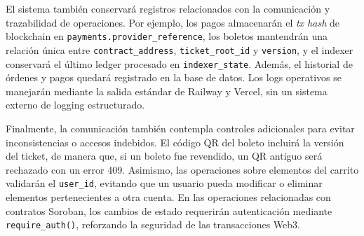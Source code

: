 \documentclass[12pt,letterpaper]{article}
\begin{document}
El sistema también conservará registros relacionados con la comunicación y
trazabilidad de operaciones. Por ejemplo, los pagos almacenarán el
\textit{tx hash} de blockchain en \texttt{payments.provider\_reference}, los
boletos mantendrán una relación única entre \texttt{contract\_address},
\texttt{ticket\_root\_id} y \texttt{version}, y el indexer conservará el
último ledger procesado en \texttt{indexer\_state}. Además, el historial de
órdenes y pagos quedará registrado en la base de datos. Los logs operativos se
manejarán mediante la salida estándar de Railway y Vercel, sin un sistema
externo de logging estructurado.

Finalmente, la comunicación también contempla controles adicionales para evitar
inconsistencias o accesos indebidos. El código QR del boleto incluirá la versión
del ticket, de manera que, si un boleto fue revendido, un QR antiguo será
rechazado con un error 409. Asimismo, las operaciones sobre elementos del
carrito validarán el \texttt{user\_id}, evitando que un usuario pueda modificar
o eliminar elementos pertenecientes a otra cuenta. En las operaciones
relacionadas con contratos Soroban, los cambios de estado requerirán
autenticación mediante \texttt{require\_auth()}, reforzando la seguridad de las
transacciones Web3.
\end{document}
